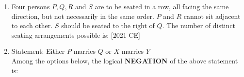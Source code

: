 \documentclass[journal]{IEEEtran}
\begin{document}
\begin{enumerate}
\begin{enumerate}
\begin{multicols}{4}
    \end{multicols}
\end{enumerate}
\item Four persons $P, Q, R$ and $S$ are to be seated in a row, all facing the same
direction, but not necessarily in the same order. $P$ and $R$ cannot sit adjacent
to each other. $S$ should be seated to the right of $Q$. The number of distinct
seating arrangements possible is: \hfill [2021 CE]
\begin{enumerate}
\end{enumerate}
\item Statement: Either $P$ marries $Q$ or $X$ marries $Y$\\
Among the options below, the logical \textbf{NEGATION} of the above statement is:


\end{enumerate}
\end{document}
